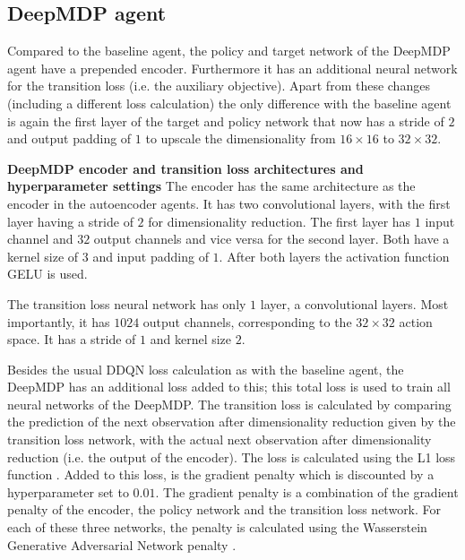 \subsection{DeepMDP agent}
Compared to the baseline agent, the policy and target network of the DeepMDP agent have a prepended encoder. Furthermore it has an additional neural network for the transition loss (i.e. the auxiliary objective). Apart from these changes (including a different loss calculation) the only difference with the baseline agent is again the first layer of the target and policy network that now has a stride of $2$ and output padding of $1$ to upscale the dimensionality from $16 \times 16$ to $32 \times 32$. \newline

\noindent \textbf{DeepMDP encoder and transition loss architectures and hyperparameter settings} \newline
\noindent The encoder has the same architecture as the encoder in the autoencoder agents. It has two convolutional layers, with the first layer having a stride of $2$ for dimensionality reduction. The first layer has $1$ input channel and $32$ output channels and vice versa for the second layer. Both have a kernel size of $3$ and input padding of $1$. After both layers the activation function GELU is used.

The transition loss neural network has only $1$ layer, a convolutional layers. Most importantly, it has $1024$ output channels, corresponding to the $32 \times 32$ action space. It has a stride of $1$ and kernel size $2$.

Besides the usual DDQN loss calculation as with the baseline agent, the DeepMDP has an additional loss added to this; this total loss is used to train all neural networks of the DeepMDP. The transition loss is calculated by comparing the prediction of the next observation after dimensionality reduction given by the transition loss network, with the actual next observation after dimensionality reduction (i.e. the output of the encoder). The loss is calculated using the L1 loss function \cite{l1}. Added to this loss, is the gradient penalty which is discounted by a hyperparameter set to $0.01$. The gradient penalty is a combination of the gradient penalty of the encoder, the policy network and the transition loss network. For each of these three networks, the penalty is calculated using the Wasserstein Generative Adversarial Network penalty \cite{wgan}.

